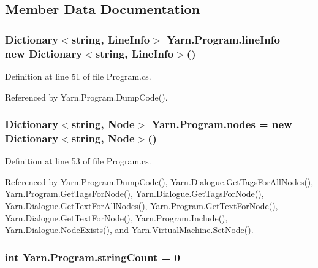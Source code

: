 \subsection{Member Data Documentation}
\hypertarget{a00138_a0d4da395947767b4a1eaaff8a9842adc}{
\subsubsection[{line\-Info}]{\setlength{\rightskip}{0pt plus 5cm}Dictionary$<$string, {\bf Line\-Info}$>$ Yarn.\-Program.\-line\-Info = new Dictionary$<$string, {\bf Line\-Info}$>$()\hspace{0.3cm}{\ttfamily [package]}}}\label{a00138_a0d4da395947767b4a1eaaff8a9842adc}


Definition at line 51 of file Program.\-cs.



Referenced by Yarn.\-Program.\-Dump\-Code().

\hypertarget{a00138_a3f4928a577c88263ad016be259b175c4}{
\subsubsection[{nodes}]{\setlength{\rightskip}{0pt plus 5cm}Dictionary$<$string, {\bf Node}$>$ Yarn.\-Program.\-nodes = new Dictionary$<$string, {\bf Node}$>$()\hspace{0.3cm}{\ttfamily [package]}}}\label{a00138_a3f4928a577c88263ad016be259b175c4}


Definition at line 53 of file Program.\-cs.



Referenced by Yarn.\-Program.\-Dump\-Code(), Yarn.\-Dialogue.\-Get\-Tags\-For\-All\-Nodes(), Yarn.\-Program.\-Get\-Tags\-For\-Node(), Yarn.\-Dialogue.\-Get\-Tags\-For\-Node(), Yarn.\-Dialogue.\-Get\-Text\-For\-All\-Nodes(), Yarn.\-Program.\-Get\-Text\-For\-Node(), Yarn.\-Dialogue.\-Get\-Text\-For\-Node(), Yarn.\-Program.\-Include(), Yarn.\-Dialogue.\-Node\-Exists(), and Yarn.\-Virtual\-Machine.\-Set\-Node().

\hypertarget{a00138_a8ef1d10094ef00311aade6715ba78ec7}{
\subsubsection[{string\-Count}]{\setlength{\rightskip}{0pt plus 5cm}int Yarn.\-Program.\-string\-Count = 0\hspace{0.3cm}{\ttfamily [private]}}}\label{a00138_a8ef1d10094ef00311aade6715ba78ec7}


